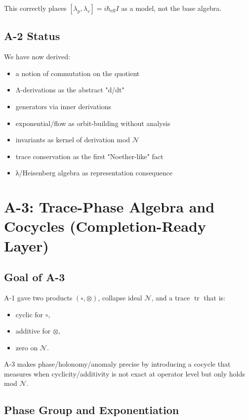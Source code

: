 \documentclass[12pt, oneside]{article}
\DeclareMathOperator{\tr}{tr}
\newcommand{\N}{\mathcal{N}}
\begin{document}
This correctly places $[\lambda_p, \lambda_v] = i\hbar_{\text{eff}} I$ as a model, not the base algebra.

\subsection{A-2 Status}

We have now derived:
\begin{itemize}
    \item a notion of commutation on the quotient
    \item Λ-derivations as the abstract "d/dt"
    \item generators via inner derivations
    \item exponential/flow as orbit-building without analysis
    \item invariants as kernel of derivation mod $\N$
    \item trace conservation as the first "Noether-like" fact
    \item λ/Heisenberg algebra as representation consequence
\end{itemize}

\newpage

\section{A-3: Trace-Phase Algebra and Cocycles (Completion-Ready Layer)}

\subsection{Goal of A-3}

A-1 gave two products $(\circ, \otimes)$, collapse ideal $\N$, and a trace $\tr$ that is:
\begin{itemize}
    \item cyclic for $\circ$,
    \item additive for $\otimes$,
    \item zero on $\N$.
\end{itemize}

A-3 makes phase/holonomy/anomaly precise by introducing a cocycle that measures when cyclicity/additivity is not exact at operator level but only holds mod $\N$.

\subsection{Phase Group and Exponentiation}
\end{document}
